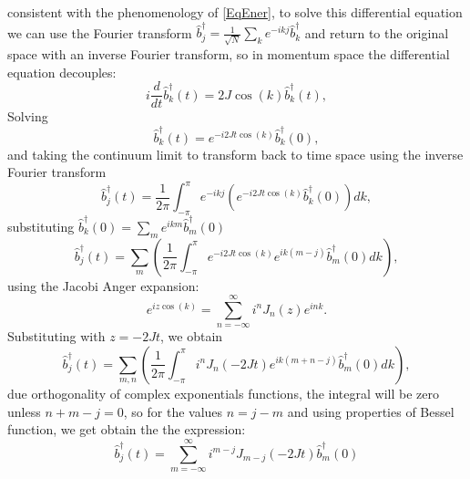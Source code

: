 consistent with the phenomenology of \eqref{EqEner}, to solve this differential equation we can use the Fourier transform $\hat{b}_j^\dagger = \frac{1}{\sqrt{N}} \sum_k e^{-ikj} \hat{b}_k^\dagger$ and return to the original space with an inverse Fourier transform, so in momentum space the differential equation decouples: 
\begin{equation} 
 i \frac{d}{dt} \hat{b}_k^\dagger (t) = 2J \cos (k) \hat{b}_k^\dagger (t),
\end{equation}
Solving 
\begin{equation} 
 \hat{b}_k^\dagger (t) = e^{-i2Jt\cos (k)} \hat{b}_k^\dagger (0),
\end{equation}
and taking the continuum limit to transform back to time space using the inverse Fourier transform 
\begin{equation} 
\hat{b}_j^\dagger (t) = \frac{1}{2\pi} \int_{-\pi}^{\pi} e^{-ikj} \left( e^{-i2Jt\cos (k)} \hat{b}_k^\dagger (0) \right) dk,
\end{equation}  
substituting $\hat{b}_k^\dagger (0) = \sum_m e^{ikm} \hat{b}_m^\dagger (0)$ 
\begin{equation} 
\hat{b}_j^\dagger (t) = \sum_m \left( \frac{1}{2\pi} \int_{-\pi}^{\pi}  e^{-i2Jt\cos (k)} e^{ik(m-j)} \hat{b}_m^\dagger (0)  dk \right) ,
\end{equation} 
using the Jacobi Anger expansion: 
\begin{equation} 
e^{iz\cos (k)} = \sum_{n=-\infty}^\infty i^n J_n (z) e^{ink}. 
\end{equation} 
Substituting with $z = -2Jt$, we obtain 
\begin{equation} 
\hat{b}_j^\dagger (t) = \sum_{m,n} \left( \frac{1}{2\pi} \int_{-\pi}^{\pi} i^n J_n (-2Jt)  e^{ik(m+n-j)} \hat{b}_m^\dagger (0)  dk \right) , 
\end{equation}
due orthogonality of complex exponentials functions, the integral will be zero unless $n+m-j=0$, so for the values $n= j-m$ and using properties of Bessel function, we get obtain the the expression: 
\begin{equation} 
\hat{b}_j^\dagger(t) = \sum_{m=-\infty}^\infty i^{m-j} J_{m-j}(-2Jt) \hat{b}_m^\dagger(0)
\end{equation}
